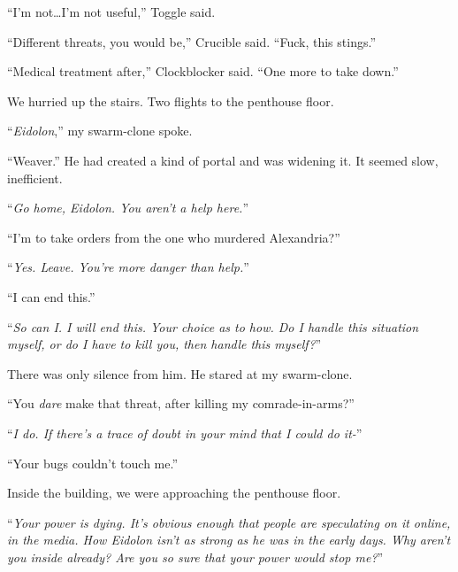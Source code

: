 ``I'm not\ldots I'm not useful,'' Toggle said.



``Different threats, you would be,'' Crucible said.  ``Fuck, this stings.''



``Medical treatment after,'' Clockblocker said.  ``One more to take down.''



We hurried up the stairs.  Two flights to the penthouse floor.



``\emph{Eidolon},'' my swarm-clone spoke.



``Weaver.''  He had created a kind of portal and was widening it.  It seemed slow, inefficient.



``\emph{Go home, Eidolon.  You aren't a help here.}''



``I'm to take orders from the one who murdered Alexandria?''



``\emph{Yes.  Leave.  You're more danger than help.}''



``I can end this.''



``\emph{So can I.  I will end this.  Your choice as to how.  Do I handle this situation myself, or do I have to kill you, then handle this myself?}''



There was only silence from him.  He stared at my swarm-clone.



``You \emph{dare} make that threat, after killing my comrade-in-arms?''



``\emph{I do.  If there's a trace of doubt in your mind that I could do it-}''



``Your bugs couldn't touch me.''



Inside the building, we were approaching the penthouse floor.



``\emph{Your power is dying.  It's obvious enough that people are speculating on it online, in the media.  How Eidolon isn't as strong as he was in the early days.  Why aren't you inside already?  Are you so sure that your power would stop me?}''



